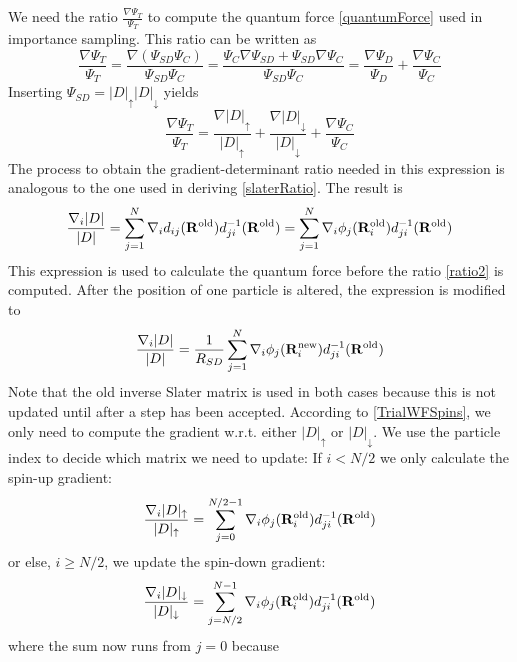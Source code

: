\documentclass[english, a4paper]{article}
\begin{document}
We need the ratio $\frac{\nabla \Psi_T}{\Psi_T}$ to compute the quantum force \eqref{quantumForce}
used in importance sampling. This ratio can be written as
\begin{equation}
 \frac{\nabla \Psi_T}{\Psi_T} = \frac{\nabla (\Psi_{SD}\Psi_C)}{\Psi_{SD}\Psi_C} = 
 \frac{\Psi_{C}\nabla\Psi_{SD} + \Psi_{SD}\nabla\Psi_C}{\Psi_{SD}\Psi_C} = 
 \frac{\nabla \Psi_D}{\Psi_D} + \frac{\nabla \Psi_C}{\Psi_C}
\end{equation}
Inserting $\Psi_{SD} = |D|_\uparrow|D|_\downarrow$ yields
\begin{equation}
 \frac{\nabla \Psi_T}{\Psi_T} = \frac{\nabla|D|_\uparrow}{|D|_\uparrow} + 
 \frac{\nabla |D|_\downarrow}{|D|_\downarrow} + \frac{\nabla \Psi_C}{\Psi_C}
\end{equation}
The process to obtain the gradient-determinant ratio needed in this expression is analogous to
the one used in deriving \eqref{slaterRatio}. The result is
\begin{equation}
 \frac{\nabla_i |D|}{|D|} = \sum_{j=1}^N \nabla_i d_{ij}({\bf R}^{\textrm{old}}) d_{ji}^{-1}
 ({\bf R}^{\textrm{old}})
        = \sum_{j=1}^N \nabla_i \phi_j({\bf R}_i^{\textrm{old}}) d_{ji}^{-1}({\bf R}^{\textrm{old}})
        \label{gradientRatioBefore}
\end{equation}
This expression is used to calculate the quantum force before the ratio \eqref{ratio2} is computed. 
After the position of one particle is altered, the expression is modified to
\begin{equation}
 \frac{\nabla_i |D|}{|D|}
        = \frac{1}{R_{SD}} \sum_{j=1}^N \nabla_i \phi_j({\bf R}_i^{\textrm{new}}) d_{ji}^{-1}({\bf R}^{\textrm{old}})
        \label{gradientRatioAfter}
\end{equation}
Note that the old inverse Slater matrix is used in both cases because this is not updated until after 
a step has been accepted. According to \eqref{TrialWFSpins}, we only need to compute the gradient w.r.t.
either $|D|_\uparrow$ or $|D|_\downarrow$. We use the particle index to decide which matrix we need 
to update: If $i < N/2$ we only calculate the spin-up gradient:
\begin{equation}
 \frac{\nabla_i |D|_\uparrow}{|D|_\uparrow} = 
 \sum_{j=0}^{N/2-1} \nabla_i \phi_j({\bf R}_i^{\textrm{old}}) d_{ji}^{-1}({\bf R}^{\textrm{old}})
\end{equation}
or else, $i \geq N/2$, we update the spin-down gradient:
\begin{equation}
 \frac{\nabla_i |D|_\downarrow}{|D|_\downarrow} = 
 \sum_{j=N/2}^{N-1} \nabla_i \phi_j({\bf R}_i^{\textrm{old}}) d_{ji}^{-1}({\bf R}^{\textrm{old}})
\end{equation}
where the sum now runs from $j=0$ because 
\end{document}
